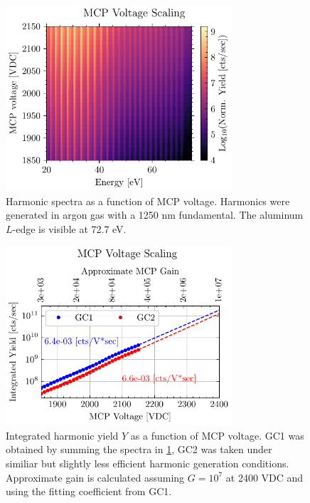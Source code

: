 \begin{figure}
	\centering
	\includegraphics[width=0.75\textwidth]{figures/chap3/MCP_voltage_spectro.pdf}
	\caption{Harmonic spectra as a function of MCP voltage. Harmonics were generated in argon gas with a 1250 nm fundamental. The aluminum $L$-edge is visible at 72.7 eV.}
	\label{fig:MCP_voltage_spectro}
\end{figure}

\begin{figure}
	\centering
	\includegraphics[width=0.75\textwidth]{figures/chap3/MCP_voltage_sum.pdf}
	\caption{Integrated harmonic yield $Y$ as a function of MCP voltage. GC1 was obtained by summing the spectra in \cref{fig:MCP_voltage_spectro}, GC2 was taken under similiar but slightly less efficient harmonic generation conditions. Approximate gain is calculated assuming $G = 10^7$ at 2400 VDC and using the fitting coefficient from GC1.}
	\label{fig:MCP_voltage_sumo}
\end{figure}

